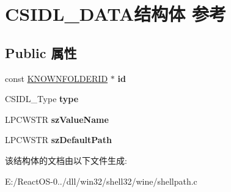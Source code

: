 \hypertarget{struct_c_s_i_d_l___d_a_t_a}{}\section{C\+S\+I\+D\+L\+\_\+\+D\+A\+T\+A结构体 参考}
\label{struct_c_s_i_d_l___d_a_t_a}
\subsection*{Public 属性}
\begin{DoxyCompactItemize}
\item 
\mbox{\label{struct_c_s_i_d_l___d_a_t_a_ae3e9d39da58321720dbbff1d489460e1}} 
const \hyperlink{interface_g_u_i_d}{K\+N\+O\+W\+N\+F\+O\+L\+D\+E\+R\+ID} $\ast$ {\bfseries id}
\item 
\mbox{\label{struct_c_s_i_d_l___d_a_t_a_a7284b9a5ed5973a90cec6c47aeddbc6c}} 
C\+S\+I\+D\+L\+\_\+\+Type {\bfseries type}
\item 
\mbox{\label{struct_c_s_i_d_l___d_a_t_a_a896403d8c767ba3f2c1ecd9aa61f5067}} 
L\+P\+C\+W\+S\+TR {\bfseries sz\+Value\+Name}
\item 
\mbox{\label{struct_c_s_i_d_l___d_a_t_a_a84b4f9c8d7a9213880bc40019a2e46fb}} 
L\+P\+C\+W\+S\+TR {\bfseries sz\+Default\+Path}
\end{DoxyCompactItemize}


该结构体的文档由以下文件生成\+:\begin{DoxyCompactItemize}
\item 
E\+:/\+React\+O\+S-\/0../dll/win32/shell32/wine/shellpath.\+c\end{DoxyCompactItemize}
